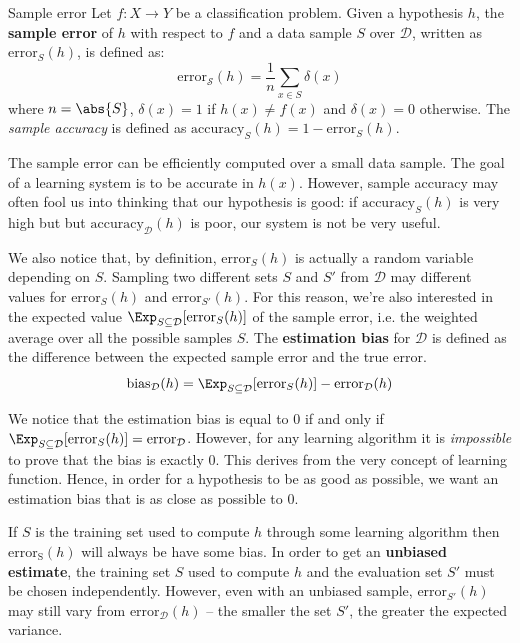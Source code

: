 \documentclass[a4paper, 12pt]{report}
\begin{document}
    \begin{frameddefn}{Sample error}
        Let $f : X \to Y$ be a classification problem. Given a hypothesis $h$, the \textbf{sample error} of $h$ with respect to $f$ and a data sample $S$ over $\mathcal{D}$, written as $\mathrm{error}_S(h)$, is defined as:
        \[\mathrm{error}_\mathcal{S}(h) = \frac{1}{n} \sum_{x \in S} \delta(x)\]
        where $n=\abs{S}$, $\delta(x) = 1$ if $h(x) \neq f(x)$ and $\delta(x) = 0$ otherwise. The \textit{sample accuracy} is defined as $\mathrm{accuracy}_S(h) = 1-\mathrm{error}_{S}(h)$.
    \end{frameddefn}
    
    The sample error can be efficiently computed over a small data sample. The goal of a learning system is to be accurate in $h(x)$. However, sample accuracy may often fool us into thinking that our hypothesis is good: if $\mathrm{accuracy}_{S}(h)$ is very high but but $\mathrm{accuracy}_\mathcal{D}(h)$ is poor, our system is not be very useful.
    
    We also notice that, by definition, $\mathrm{error}_S(h)$ is actually a random variable depending on $S$. Sampling two different sets $S$ and $S'$ from $\mathcal{D}$ may different values for $\mathrm{error}_S(h)$ and $\mathrm{error}_{S'}(h)$. For this reason, we're also interested in the expected value $\Exp_{S \subseteq \mathcal{D}}[\mathrm{error}_S(h)]$ of the sample error, i.e. the weighted average over all the possible samples $S$. The \textbf{estimation bias} for $\mathcal{D}$ is defined as the difference between the expected sample error and the true error.
    \[\mathrm{bias}_\mathcal{D}(h) = \Exp_{S \subseteq \mathcal{D}}[\mathrm{error}_S(h)] - \mathrm{error}_\mathcal{D}(h)\]
    
    We notice that the estimation bias is equal to 0 if and only if $\Exp_{S \subseteq \mathcal{D}}[\mathrm{error}_S(h)] = \mathrm{error}_\mathcal{D}$. However, for any learning algorithm it is \textit{impossible} to prove that the bias is exactly 0. This derives from the very concept of learning function. Hence, in order for a hypothesis to be as good as possible, we want an estimation bias that is as close as possible to 0.
    
    If $S$ is the training set used to compute $h$ through some learning algorithm then $\mathrm{error_S}(h)$ will always be have some bias. In order to get an \textbf{unbiased estimate}, the training set $S$ used to compute $h$ and the evaluation set $S'$ must be chosen independently. However, even with an unbiased sample, $\mathrm{error}_{S'}(h)$ may still vary from $\mathrm{error}_{\mathcal{D}}(h)$ -- the smaller the set $S'$, the greater the expected variance.
\end{document}
